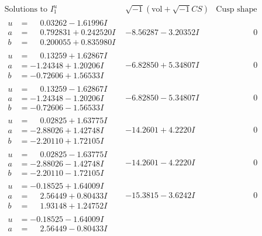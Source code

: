 \documentclass[1p]{elsarticle_modified}
\theoremstyle{definition}
\newcommand{\I}{\sqrt{-1}}
\begin{document}
$$\begin{array}{c|c|c}
\text{Solutions to }I^u_{1}& \I (\text{vol} + \sqrt{-1}CS) & \text{Cusp shape}\\
 \hline 
\begin{aligned}
u &= \phantom{-}0.03262 - 1.61996 I \\
a &= \phantom{-}0.792831 + 0.242520 I \\
b &= \phantom{-}0.200055 + 0.835980 I\end{aligned}
 & -8.56287 - 3.20352 I & \phantom{-0.000000 } 0 \\ \hline\begin{aligned}
u &= \phantom{-}0.13259 + 1.62867 I \\
a &= -1.24348 + 1.20206 I \\
b &= -0.72606 + 1.56533 I\end{aligned}
 & -6.82850 + 5.34807 I & \phantom{-0.000000 } 0 \\ \hline\begin{aligned}
u &= \phantom{-}0.13259 - 1.62867 I \\
a &= -1.24348 - 1.20206 I \\
b &= -0.72606 - 1.56533 I\end{aligned}
 & -6.82850 - 5.34807 I & \phantom{-0.000000 } 0 \\ \hline\begin{aligned}
u &= \phantom{-}0.02825 + 1.63775 I \\
a &= -2.88026 + 1.42748 I \\
b &= -2.20110 + 1.72105 I\end{aligned}
 & -14.2601 + 4.2220 I & \phantom{-0.000000 } 0 \\ \hline\begin{aligned}
u &= \phantom{-}0.02825 - 1.63775 I \\
a &= -2.88026 - 1.42748 I \\
b &= -2.20110 - 1.72105 I\end{aligned}
 & -14.2601 - 4.2220 I & \phantom{-0.000000 } 0 \\ \hline\begin{aligned}
u &= -0.18525 + 1.64009 I \\
a &= \phantom{-}2.56449 + 0.80433 I \\
b &= \phantom{-}1.93148 + 1.24752 I\end{aligned}
 & -15.3815 - 3.6242 I & \phantom{-0.000000 } 0 \\ \hline\begin{aligned}
u &= -0.18525 - 1.64009 I \\
a &= \phantom{-}2.56449 - 0.80433 I \\

\end{aligned}
\end{array}$$
\end{document}
